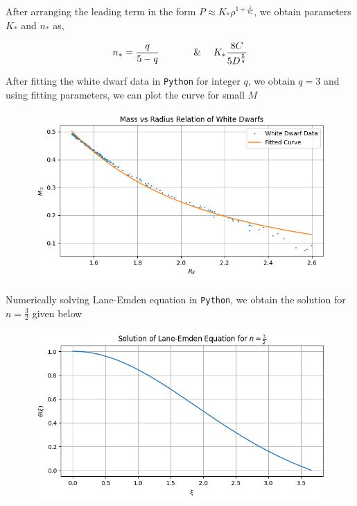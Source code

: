 \documentclass[aps,twocolumn,showpacs,preprintnumbers,nofootinbib,prl,superscriptaddress,groupedaddress]{revtex4-2}
\begin{document}
After arranging the leading term in the form $P \approx K_* \rho^{1+\frac{1}{n_*}}$, we obtain parameters $K_*$ and $n_*$ as,

\begin{align}
	n_* = \frac{q}{5-q} & \quad\quad\quad \And & K_* \frac{8C}{5D^{\frac{5}{q}}}
\end{align}

After fitting the white dwarf data in \texttt{Python} for integer $q$, we obtain $q=3$ and using fitting parameters, we can plot the curve for small $M$

\begin{figure}[!htb]
	\centering
	\includegraphics[width=1\linewidth]{Plots/newton-part-c1}
	\label{fig:newton-part-c1}
\end{figure}
\FloatBarrier

Numerically solving Lane-Emden equation in \texttt{Python}, we obtain the solution for $n=\frac{3}{2}$ given below 

\begin{figure}[!htb]
	\centering
	\includegraphics[width=1\linewidth]{Plots/newton-part-c2}
	\label{fig:newton-part-c2}
\end{figure}
\FloatBarrier
\end{document}
